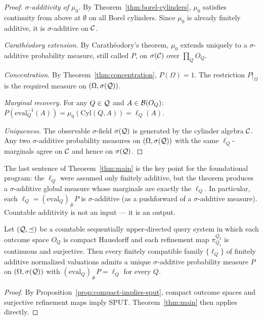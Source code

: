 \begin{proof}
\emph{$\sigma$-additivity of $\mu_0$.}
By Theorem~\ref{thm:borel-cylinders}, $\mu_0$ satisfies continuity
from above at $\emptyset$ on all Borel cylinders.  Since $\mu_0$ is
already finitely additive, it is $\sigma$-additive on $\mathcal{C}$.

\emph{Carath\'eodory extension.}
By Carath\'eodory's theorem, $\mu_0$ extends uniquely to a
$\sigma$-additive probability measure, still called $P$, on
$\sigma(\mathcal{C})$ over $\prod_Q O_Q$.

\emph{Concentration.}
By Theorem~\ref{thm:concentration}, $P(\Omega) = 1$.  The
restriction $P|_\Omega$ is the required measure on
$(\Omega, \sigma(\mathcal{Q}))$.

\emph{Marginal recovery.}
For any $Q \in \mathcal{Q}$ and $A \in \mathcal{B}(O_Q)$:
$P(\mathrm{eval}_Q^{-1}(A)) = \mu_0(\mathrm{Cyl}(Q,A)) = \ell_Q(A)$.

\emph{Uniqueness.}
The observable $\sigma$-field $\sigma(\mathcal{Q})$ is generated by the
cylinder algebra $\mathcal{C}$.  Any two $\sigma$-additive probability
measures on $(\Omega, \sigma(\mathcal{Q}))$ with the same $\ell_Q$-marginals
agree on $\mathcal{C}$ and hence on $\sigma(\mathcal{Q})$.
\end{proof}

\begin{remark}
The last sentence of Theorem~\ref{thm:main} is the key point for
the foundational program: the $\ell_Q$ were assumed only finitely
additive, but the theorem produces a $\sigma$-additive global
measure whose marginals are exactly the $\ell_Q$.  In particular,
each $\ell_Q = (\mathrm{eval}_Q)_\# P$ is $\sigma$-additive (as
a pushforward of a $\sigma$-additive measure).  Countable additivity
is not an input --- it is an output.
\end{remark}

\begin{corollary}
\label{cor:architectural}
Let $(\mathcal{Q}, \preceq)$ be a countable sequentially upper-directed
query system in which each outcome space $O_Q$ is compact Hausdorff
and each refinement map $\pi^{Q_2}_{Q_1}$ is continuous and
surjective.  Then every finitely compatible family $\{\ell_Q\}$ of
finitely additive normalized valuations admits a unique
$\sigma$-additive probability measure $P$ on $(\Omega,\sigma(\mathcal{Q}))$
with $(\mathrm{eval}_Q)_\# P = \ell_Q$ for every $Q$.
\end{corollary}

\begin{proof}
By Proposition~\ref{prop:compact-implies-sput}, compact outcome
spaces and surjective refinement maps imply SPUT.
Theorem~\ref{thm:main} then applies directly.
\end{proof}

